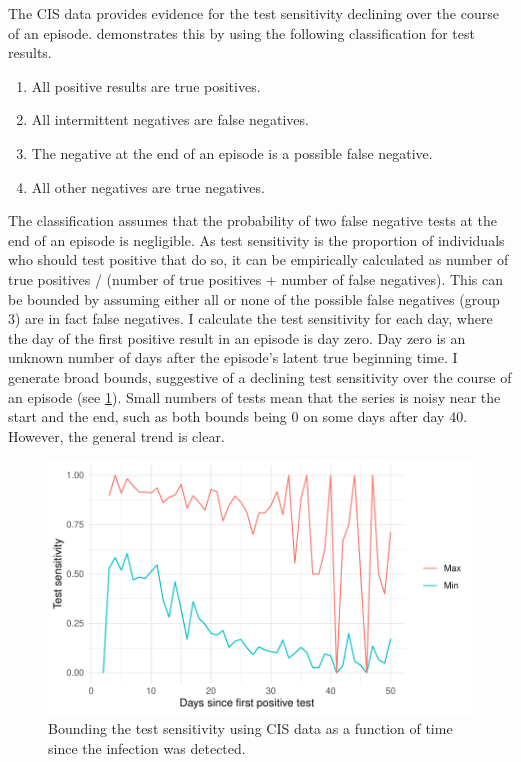 \documentclass[thesis.tex]{subfiles}
\begin{document}
The CIS data provides evidence for the test sensitivity declining over the course of an episode.
 demonstrates this by using the following classification for test results.
\begin{enumerate}
    \item All positive results are true positives.
    \item All intermittent negatives are false negatives.
    \item The negative at the end of an episode is a possible false negative.
    \item All other negatives are true negatives.
\end{enumerate}
The classification assumes that the probability of two false negative tests at the end of an episode is negligible.
As test sensitivity is the proportion of individuals who should test positive that do so, it can be empirically calculated as number of true positives / (number of true positives + number of false negatives).
This can be bounded by assuming either all or none of the possible false negatives (group 3) are in fact false negatives.
I calculate the test sensitivity for each day, where the day of the first positive result in an episode is day zero.
Day zero is an unknown number of days after the episode's latent true beginning time.
I generate broad bounds, suggestive of a declining test sensitivity over the course of an episode (see \cref{imperf-test:fig:bounding-cis-sensitivity}).
Small numbers of tests mean that the series is noisy near the start and the end, such as both bounds being 0 on some days after day 40.
However, the general trend is clear.
\begin{figure}
  \includegraphics{cis-imperfect-testing/test-sens-bound}
  \caption[Bounding test sensitivity using CIS data]{
    Bounding the test sensitivity using CIS data as a function of time since the infection was detected.
  }
  \label{imperf-test:fig:bounding-cis-sensitivity}
\end{figure}
\end{document}
